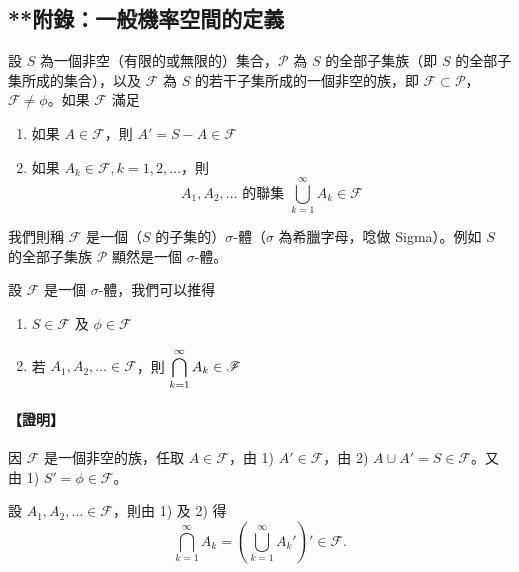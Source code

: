 \vspace{2em}
\subsection*{**附錄：一般機率空間的定義}\label{sec:b5-ch4-appendix}

設 $S$ 為一個非空（有限的或無限的）集合，$\mathscr{P}$ 為 $S$ 的全部子集族（即 $S$ 的全部子集所成的集合），以及 $\mathscr{F}$ 為 $S$ 的若干子集所成的一個非空的族，即 $\mathscr{F} \subset \mathscr{P}$，$\mathscr{F} \neq \phi$。如果 $\mathscr{F}$ 滿足
\begin{enumerate}[label=\arabic*)]
  \item 如果 $A \in \mathscr{F}$，則 $A' = S - A \in \mathscr{F}$
  \item 如果 $A_k \in \mathscr{F}, k = 1, 2, \dots$，則
  \[
  A_1, A_2, \dots \text{ 的聯集 } \bigcup_{k=1}^\infty A_k \in \mathscr{F}
  \]
\end{enumerate}
我們則稱 $\mathscr{F}$ 是一個（$S$ 的子集的）$\sigma$-體（$\sigma$ 為希臘字母，唸做 Sigma）。例如 $S$ 的全部子集族 $\mathscr{P}$ 顯然是一個 $\sigma$-體。

設 $\mathscr{F}$ 是一個 $\sigma$-體，我們可以推得
\begin{enumerate}[label=\roman*)]
  \item $S \in \mathscr{F}$ 及 $\phi \in \mathscr{F}$
  \item 若 $A_1, A_2, \dots \in \mathscr{F}$，則 $\displaystyle\bigcap_{k=1}^\infty A_k \in \mathscr{F}$
\end{enumerate}
\paragraph{【證明】}
因 $\mathscr{F}$ 是一個非空的族，任取 $A \in \mathscr{F}$，由 1) $A' \in \mathscr{F}$，由 2) $A \cup A' = S \in \mathscr{F}$。又由 1) $S' = \phi \in \mathscr{F}$。

設 $A_1, A_2, \dots \in \mathscr{F}$，則由 1) 及 2) 得
\[
\bigcap_{k=1}^\infty A_k = \left( \bigcup_{k=1}^\infty A_k' \right)' \in \mathscr{F}. \tag*{\#}
\]

